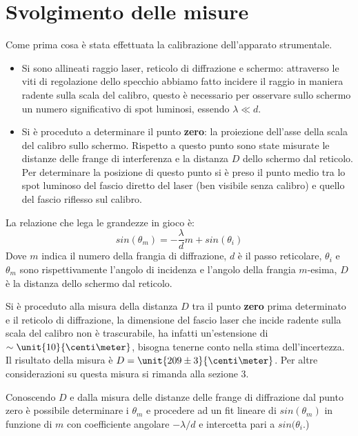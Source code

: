 \section{Svolgimento delle misure}
Come prima cosa è stata effettuata la calibrazione dell'apparato 
strumentale.
\begin{itemize}
	\item Si sono allineati raggio laser, reticolo di diffrazione e schermo: attraverso le viti di regolazione dello specchio abbiamo fatto incidere il raggio in maniera radente sulla scala del calibro, questo è necessario per osservare sullo schermo un numero significativo di spot luminosi, essendo $\lambda \ll d$.
	\item Si è proceduto a determinare il punto \textbf{zero}: la proiezione dell'asse della scala del calibro sullo schermo. Rispetto a questo punto sono state misurate le distanze delle frange di interferenza e la distanza $D$ dello schermo dal reticolo. Per determinare la posizione di questo punto si è preso il punto medio tra lo spot luminoso del fascio diretto del laser (ben visibile senza calibro) e quello del fascio riflesso sul calibro.
\end{itemize}
La relazione che lega le grandezze in gioco è:
$$ sin (\theta_m) =-\frac{\lambda}{d}m+sin (\theta_i)$$
Dove $m$ indica il numero della frangia di diffrazione, $d$ è il passo reticolare, $\theta_i$ e $\theta_m$ sono rispettivamente l'angolo di incidenza e l'angolo della frangia $m$-esima, $D$ è la distanza dello schermo dal reticolo.

Si è proceduto alla misura della distanza $D$ tra il punto \textbf{zero} prima determinato e il reticolo di diffrazione, la dimensione del fascio laser che incide radente sulla scala del calibro non è trascurabile, ha infatti un'estensione di $\sim \unit{10}{\centi\meter}$, bisogna tenerne conto nella stima dell'incertezza. Il risultato della misura è $D = \unit{209 \pm 3}{\centi\meter}$. Per altre considerazioni su questa misura si rimanda alla sezione 3.

Conoscendo $D$ e dalla misura delle distanze delle frange di diffrazione dal punto zero è possibile determinare i $\theta_m$ e procedere ad un fit lineare di $sin(\theta_m)$ in funzione di $m$ con coefficiente angolare $-\lambda/d$ e intercetta pari a $sin(\theta_i$.)

